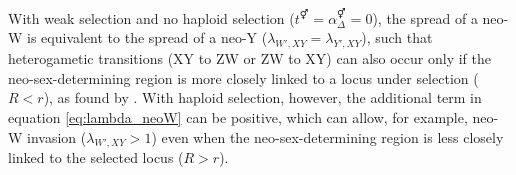 \documentclass[12pt]{article}
\begin{document}
With weak selection and no haploid selection ($t^\Hermaphrodite=\alpha^\Hermaphrodite_{\Delta}=0$), the spread of a neo-W is equivalent to the spread of a neo-Y ($\lambda_{W',XY}=\lambda_{Y',XY}$), such that heterogametic transitions (XY to ZW or ZW to XY) can also occur only if the neo-sex-determining region is more closely linked to a locus under selection ($R<r$), as found by \citet{vanDoorn:2010hu}. 
With haploid selection, however, the additional term in equation \eqref{eq:lambda_neoW} can be positive, which can allow, for example, neo-W invasion ($\lambda_{W',XY}>1$) even when the neo-sex-determining region is less closely linked to the selected locus ($R>r$). 
\end{document}
